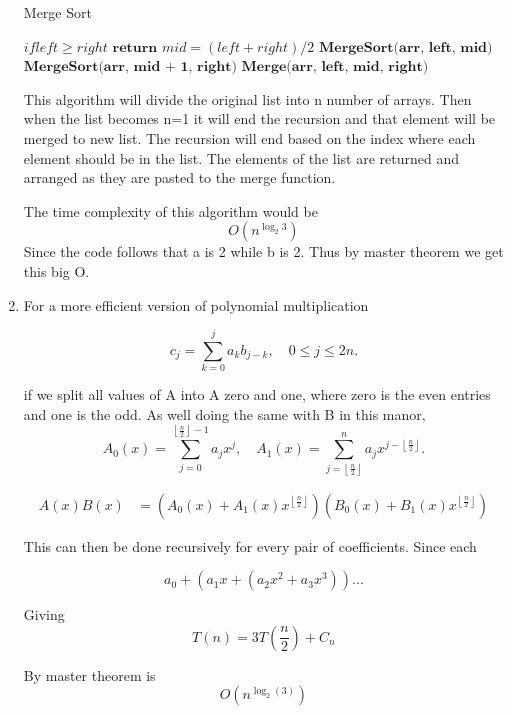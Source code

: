 \begin{enumerate}
\begin{algorithm}[H]
\caption{Merge Sort}
\label{alg:euclid}
\begin{algorithmic}[1] 
    \State $if left \geq right$
    \State $\textbf{return}$
    \State $mid = (left+right)/2$
    \State $\textbf{MergeSort(arr, left, mid)}$
    \State $\textbf{MergeSort(arr, mid + 1, right)}$
    \State $\textbf{Merge(arr, left, mid, right)}$
    \EndProcedure
\end{algorithmic}
\end{algorithm}

This algorithm will divide the original list into n number of arrays. Then when the list becomes n=1 it will end the recursion and that element will be merged to new list. The recursion will end based on the index where each element should be in the list. The elements of the list are returned and arranged as they are pasted to the merge function. 

The time complexity of this algorithm would be 
\begin{equation}
O\left(n^{\log _{2} 3}\right)
\end{equation}
Since the code follows that a is 2 while b is 2. Thus by master theorem we get this big O. 

\item For a more efficient version of polynomial multiplication

\begin{equation}
c_j = \sum_{k=0}^j a_k b_{j-k},\quad 0\leqslant j\leqslant 2n.
\end{equation}

if we split all values of A into A zero and one, where zero is the even entries and one is the odd. As well doing the same with B in this manor, 
\begin{equation}
A_0(x) = \sum_{j=0}^{\left\lfloor\frac n2\right\rfloor-1}a_jx^j,\quad A_1(x) = \sum_{j=\left\lfloor\frac n2\right\rfloor}^{n}a_jx^{j-\left\lfloor\frac n2\right\rfloor}.
\end{equation}

\begin{align}
A(x)B(x) &= \left(A_0(x) + A_1(x)x^{\left\lfloor\frac n2\right\rfloor}\right)\left(B_0(x) + B_1(x)x^{\left\lfloor\frac n2\right\rfloor}\right)
\end{align}

This can then be done recursively for every pair of coefficients. Since each 

\begin{equation}
a_{0}+\left(a_{1} x+  \left(a_{2} x^{2}+a_{3} x^{3}\right)\right)...
\end{equation}

Giving 
\begin{equation}
T(n)= 3T( \frac n2) + C_n
\end{equation}

By master theorem is
\begin{equation}
 O(n ^ {\log_{2}(3)} )
\end{equation}

\end{enumerate}
